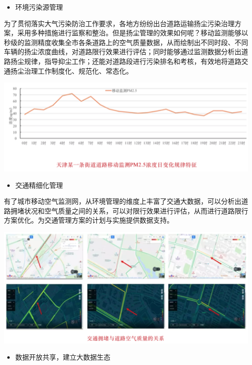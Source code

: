 \documentclass[]{book}
\providecommand{\tightlist}{%
  \setlength{\itemsep}{0pt}\setlength{\parskip}{0pt}}
\begin{document}
\begin{itemize}
\tightlist
\item
  环境污染源管理
\end{itemize}

为了贯彻落实大气污染防治工作要求，各地方纷纷出台道路运输扬尘污染治理方案，采用多种措施进行监察和整治。但是扬尘管理的效果如何呢？移动监测能够以秒级的监测精度收集全市各条道路上的空气质量数据，从而绘制出不同时段、不同车辆的扬尘浓度曲线，对道路限行效果进行评估；同时能够通过监测数据分析出道路扬尘规律，指导抑尘工作；还能对道路段进行污染排名和考核，有效地将道路交通扬尘治理工作制度化、规范化、常态化。

\includegraphics[width=6.67in]{images/dlyd3}

\begin{itemize}
\tightlist
\item
  交通精细化管理
\end{itemize}

有了城市移动空气监测网，从环境管理的维度上丰富了交通大数据，可以分析出道路拥堵状况和空气质量之间的关系，可以对限行效果进行评估，从而进行道路限行方案优化。为交通管理方案的计划与实施提供数据支持。

\includegraphics[width=6.67in]{images/dlyd4}

\begin{itemize}
\tightlist
\item
  数据开放共享，建立大数据生态
\end{itemize}
\end{document}
